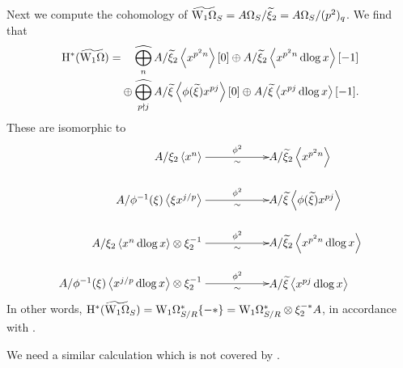 \begin{example}
Next we compute the cohomology of $\widetilde{\dRW[1]}_S = \AOmega_S/\~\xi_2 = \AOmega_S/(p^2)_q$. We find that
  \begin{align*}
    \H^*(\widetilde{\dRW[1]})
      &= \phantom{{}\oplus} \bigoplusp_n A/\~\xi_2\<x^{p^2 n}\>[0] \oplus A/\~\xi_2\<x^{p^2 n}\dlog x\>[-1]\\
      &\phantom{{}=} \oplus \bigoplusp_{p\nmid j} A/\~\xi\<\phi(\~\xi) x^{pj}\>[0] \oplus A/\~\xi\<x^{pj}\dlog x\>[-1].
  \end{align*}
  These are isomorphic to
  \[\xymatrix@R=2em@C=-5em{
      *!R{A/\xi_2\<x^n\>\ } \ar[r]^-{\phi^2}_-\sim & *!L{A/\~\xi_2\<x^{p^2n}\>}\\
      *!R{A/\phi^{-1}(\xi)\<\xi x^{j/p}\>\ } \ar[r]^-{\phi^2}_-\sim & *!L{A/\~\xi\<\phi(\~\xi) x^{pj}\>}\\
      *!R{A/\xi_2\<x^n\dlog x\>\tnsr \xi_2^{-1}\ } \ar[r]^-{\phi^2}_-\sim & *!L{A/\~\xi_2\<x^{p^2n}\dlog x\>}\\
      *!R{A/\phi^{-1}(\xi)\<x^{j/p}\dlog x\>\tnsr \xi_2^{-1}\ } \ar[r]^-{\phi^2}_-\sim & *!L{A/\~\xi\<x^{pj}\dlog x\>}
  }\]
  In other words, $\H^*(\widetilde{\dRW[1]}_S) = \dRW[1]^*_{S/R}\{-*\}=\dRW[1]^*_{S/R} \tnsr \xi_2^{-*}A$, in accordance with \cite[Theorem 11.1]{BMS1}.
\end{example}

We need a similar calculation which is not covered by \cite[Theorem 11.1]{BMS1}.

